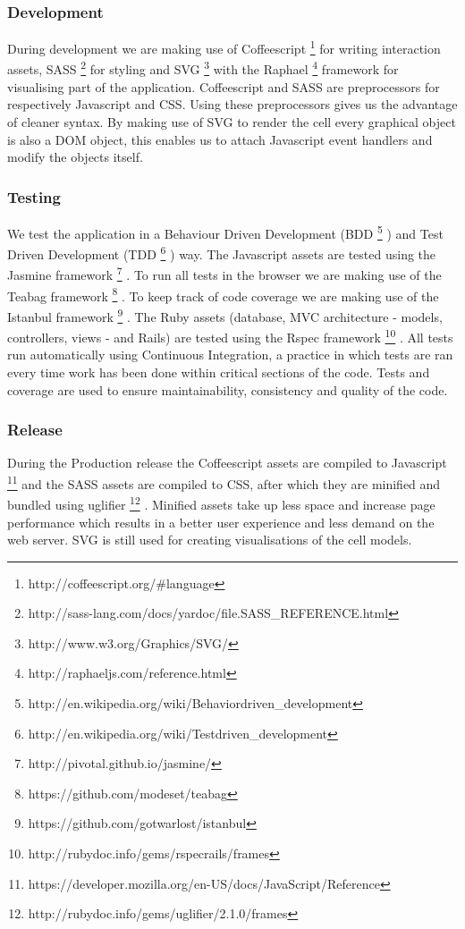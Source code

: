 \documentclass{report}
\begin{document}
			\subsubsection{Development}
				During development we are making use of Coffeescript \footnote{http://coffeescript.org/\#language} for writing interaction assets, SASS \footnote{http://sass-lang.com/docs/yardoc/file.SASS\_REFERENCE.html} for styling and SVG \footnote{http://www.w3.org/Graphics/SVG/} with the Raphael \footnote{http://raphaeljs.com/reference.html} framework for visualising part of the application.
				Coffeescript and SASS are preprocessors for respectively Javascript and CSS. Using these preprocessors gives us the advantage of cleaner syntax.
				By making use of SVG to render the cell every graphical object is also a DOM object, this enables us to attach Javascript event handlers and modify the objects itself.
				
			\subsubsection{Testing}
				We test the application in a Behaviour Driven Development (BDD \footnote{http://en.wikipedia.org/wiki/Behavior\-driven\_development} ) and Test Driven Development (TDD \footnote{http://en.wikipedia.org/wiki/Test\-driven\_development} ) way. 
				The Javascript assets are tested using the Jasmine framework \footnote{http://pivotal.github.io/jasmine/} . 
				To run all tests in the browser we are making use of the Teabag framework \footnote{https://github.com/modeset/teabag} . 
				To keep track of code coverage we are making use of the Istanbul framework \footnote{https://github.com/gotwarlost/istanbul} .
				The Ruby assets (database, MVC architecture - models, controllers, views - and Rails) are tested using the Rspec framework \footnote{http://rubydoc.info/gems/rspec\-rails/frames} .  
				All tests run automatically using Continuous Integration, a practice in which tests are ran every time work has been done within critical sections of the code. 
				Tests and coverage are used to ensure maintainability, consistency and quality of the code.
				
			\subsubsection{Release}
				During the Production release the Coffeescript assets are compiled to Javascript \footnote{https://developer.mozilla.org/en-US/docs/JavaScript/Reference} and the SASS assets are compiled to CSS, after which they are minified and bundled using uglifier \footnote{http://rubydoc.info/gems/uglifier/2.1.0/frames} . Minified assets take up less space and increase page performance which results in a better user experience and less demand on the web server. 
				SVG is still used for creating visualisations of the cell models.
		\newpage		
\end{document}
